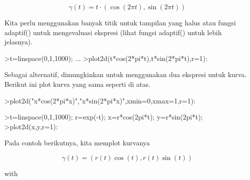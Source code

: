 \documentclass{article}
\begin{document}
\begin{eulernotebook}
\begin{eulercomment}
\begin{eulercomment}
\begin{eulercomment}
\begin{eulercomment}
\begin{eulercomment}
\begin{eulercomment}
\begin{eulercomment}
\begin{eulercomment}
\begin{eulercomment}
\begin{eulercomment}
\begin{eulercomment}
\begin{eulercomment}
\begin{eulercomment}
\begin{eulercomment}
\begin{eulercomment}
\end{eulercomment}
\begin{eulerformula}
\[
\gamma(t) = t \cdot (\cos(2\pi t),\sin(2\pi t))
\]
\end{eulerformula}
\begin{eulercomment}
Kita perlu menggunakan banyak titik untuk tampilan yang halus atau
fungsi adaptif() untuk mengevaluasi ekspresi (lihat fungsi adaptif()
untuk lebih jelasnya).
\end{eulercomment}
\begin{eulerprompt}
>t=linspace(0,1,1000); ...
>plot2d(t*cos(2*pi*t),t*sin(2*pi*t),r=1):
\end{eulerprompt}
\begin{eulercomment}
Sebagai alternatif, dimungkinkan untuk menggunakan dua ekspresi untuk
kurva. Berikut ini plot kurva yang sama seperti di atas.
\end{eulercomment}
\begin{eulerprompt}
>plot2d("x*cos(2*pi*x)","x*sin(2*pi*x)",xmin=0,xmax=1,r=1):
\end{eulerprompt}
\begin{eulerprompt}
>t=linspace(0,1,1000); r=exp(-t); x=r*cos(2pi*t); y=r*sin(2pi*t);
>plot2d(x,y,r=1):
\end{eulerprompt}
\begin{eulercomment}
Pada contoh berikutnya, kita memplot kurvanya

\end{eulercomment}
\begin{eulerformula}
\[
\gamma(t) = (r(t) \cos(t), r(t) \sin(t))
\]
\end{eulerformula}
\begin{eulercomment}
with


\end{eulercomment}
\end{eulercomment}
\end{eulercomment}
\end{eulercomment}
\end{eulercomment}
\end{eulercomment}
\end{eulercomment}
\end{eulercomment}
\end{eulercomment}
\end{eulercomment}
\end{eulercomment}
\end{eulercomment}
\end{eulercomment}
\end{eulercomment}
\end{eulercomment}
\end{eulernotebook}
\end{document}
